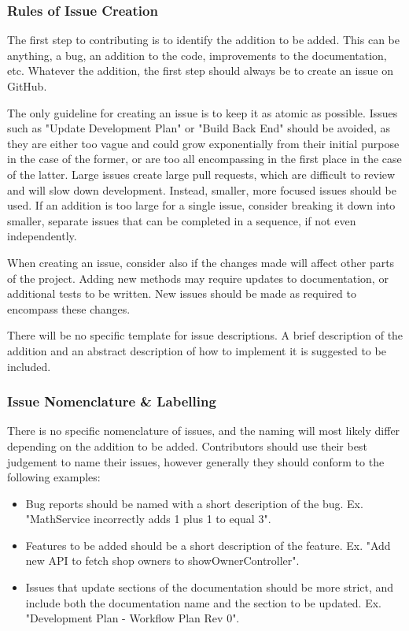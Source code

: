 \documentclass{article}
\begin{document}
\subsubsection{Rules of Issue Creation}

The first step to contributing is to identify the addition to be added. This can be anything, a bug, an addition to the code, improvements to the documentation, etc. Whatever the addition, the first step should always be to create an issue on GitHub.

The only guideline for creating an issue is to keep it as atomic as possible. Issues such as "Update Development Plan" or "Build Back End" should be avoided, as they are either too vague and could grow exponentially from their initial purpose in the case of the former, or are too all encompassing in the first place in the case of the latter. Large issues create large pull requests, which are difficult to review and will slow down development. Instead, smaller, more focused issues should be used. If an addition is too large for a single issue, consider breaking it down into smaller, separate issues that can be completed in a sequence, if not even independently.

When creating an issue, consider also if the changes made will affect other parts of the project. Adding new methods may require updates to documentation, or additional tests to be written. New issues should be made as required to encompass these changes.

There will be no specific template for issue descriptions. A brief description of the addition and an abstract description of how to implement it is suggested to be included.

\subsubsection{Issue Nomenclature \& Labelling}

There is no specific nomenclature of issues,  and the naming will most likely differ depending on the addition to be added. Contributors should use their best judgement to name their issues, however generally they should conform to the following examples:
\begin{itemize}
    \item Bug reports should be named with a short description of the bug. Ex. "MathService incorrectly adds 1 plus 1 to equal 3".
    \item Features to be added should be a short description of the feature. Ex. "Add new API to fetch shop owners to showOwnerController".
    \item Issues that update sections of the documentation should be more strict, and include both the documentation name and the section to be updated. Ex. "Development Plan - Workflow Plan Rev 0".
\end{itemize}
\end{document}
